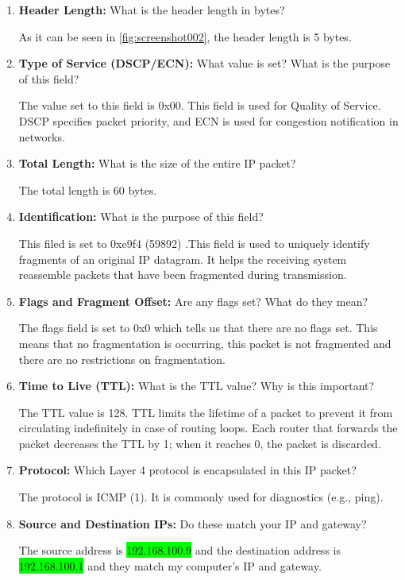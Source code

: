 \documentclass[a4paper]{article}
\begin{document}
	\begin{enumerate}
		\item \textbf{Header Length:} What is the header length in bytes?
		
		As it can be seen in \ref{fig:screenshot002}, the header length is 5 bytes.
		
		\item \textbf{Type of Service (DSCP/ECN):} What value is set? What is the purpose of this field?
		
		The value set to this field is 0x00. This field is used for Quality of Service. DSCP specifies packet priority, and ECN is used for congestion notification in networks.
		
		\item \textbf{Total Length:} What is the size of the entire IP packet?
		
		The total length is 60 bytes.
		
		\item \textbf{Identification:} What is the purpose of this field?
		
		This filed is set to 0xe9f4 (59892) .This field is used to uniquely identify fragments of an original IP datagram. It helps the receiving system reassemble packets that have been fragmented during transmission.
		
		\item \textbf{Flags and Fragment Offset:} Are any flags set? What do they mean?
		
		The flags field is set to 0x0 which tells us that there are no flags set. This means that no fragmentation is occurring, this packet is not fragmented and there are no restrictions on fragmentation.
		
		\item \textbf{Time to Live (TTL):} What is the TTL value? Why is this important?
		
		The TTL value is 128. TTL limits the lifetime of a packet to prevent it from circulating indefinitely in case of routing loops. Each router that forwards the packet decreases the TTL by 1; when it reaches 0, the packet is discarded.
		 
		\item \textbf{Protocol:} Which Layer 4 protocol is encapsulated in this IP packet?
		
		The protocol is ICMP (1). It is commonly used for diagnostics (e.g., ping).
		
		\item \textbf{Source and Destination IPs:} Do these match your IP and gateway?
		
		The source address is \colorbox{lime}{192.168.100.9} and the destination address is \colorbox{lime}{192.168.100.1} and they match my computer's IP and gateway. 
		 
	\end{enumerate}
	
\end{document}
